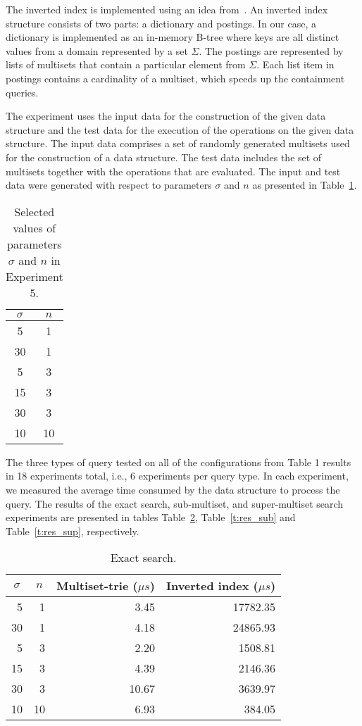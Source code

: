 The inverted index is implemented using an idea
from~\cite{Helmer2003}. An inverted index structure consists of two
parts: a dictionary and postings. In our case, a dictionary is
implemented as an in-memory B-tree where keys are all distinct values
from a domain represented by a set $\Sigma.$ The postings are
represented by lists of multisets that contain a particular element
from $\Sigma.$ Each list item in postings contains a cardinality of a
multiset, which speeds up the containment queries.

The experiment uses the input data for the construction of the given
data structure and the test data for the execution of the operations
on the given data structure. The input data comprises a set of
randomly generated multisets used for the construction of a data
structure. The test data includes the set of multisets together with
the operations that are evaluated. The input and test data were
generated with respect to parameters $\sigma$ and $n$ as presented in
Table~\ref{t:benchmark}.

\begin{table}[h]
\center
\begin{tabular}{|c|c|}
\hline
$\sigma$ & $n$ \\
\hline
5		& 1\\
\hline
30	& 1 \\
\hline
5		& 3 \\
\hline
15	& 3 \\
\hline
30	& 3 \\
\hline
10	& 10 \\
\hline
\end{tabular}
\caption{Selected values of parameters $\sigma$ and $n$ in Experiment 5.}
\label{t:benchmark}
\end{table}

The three types of query tested on all of the configurations from
Table 1 results in 18 experiments total, i.e., 6 experiments per
query type. In each experiment, we measured the average time consumed
by the data structure to process the query. The results of the exact
search, sub-multiset, and super-multiset search experiments are
presented in tables Table~\ref{t:res_ex}, Table~\ref{t:res_sub} and
Table~\ref{t:res_sup}, respectively.

\begin{table}[h]
\center
\begin{tabular}{|r|r|r|r|}
\hline
\multicolumn{1}{|c|}{$\sigma$} & 
\multicolumn{1}{c|}{$n$} & 
\multicolumn{1}{c|}{Multiset-trie ($\mu s$)} & 
\multicolumn{1}{c|}{Inverted index ($\mu s$)} \\
\hline
5		& 1 & 3.45 & 17782.35\\
\hline
30	& 1 & 4.18 & 24865.93\\
\hline
5		& 3 & 2.20 & 1508.81\\
\hline
15	& 3 & 4.39 & 2146.36\\
\hline
30	& 3 & 10.67 & 3639.97\\
\hline
10	& 10 & 6.93 & 384.05\\
\hline
\end{tabular}
\caption{Exact search.}
\label{t:res_ex}
\end{table}

